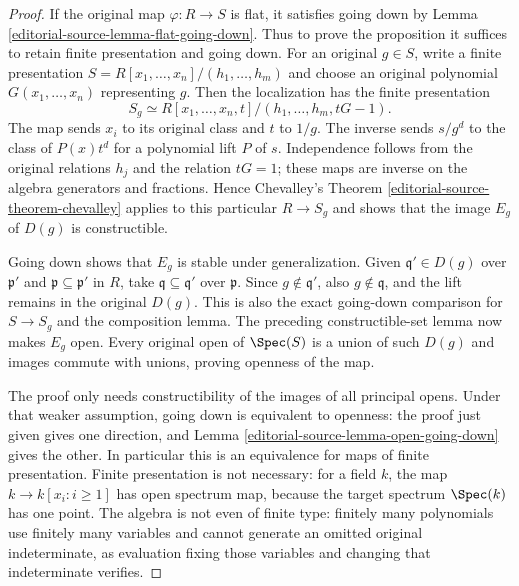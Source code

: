 \begin{proof}
If the original map $\varphi:R\to S$ is flat, it
satisfies going down by Lemma \ref{editorial-source-lemma-flat-going-down}.
Thus to prove the proposition it suffices to retain
finite presentation and going down.
For an original $g\in S$, write a finite presentation
$S=R[x_1,\ldots,x_n]/(h_1,\ldots,h_m)$ and choose
an original polynomial $G(x_1,\ldots,x_n)$ representing
$g$. Then the localization has the finite presentation
$$
S_g\simeq
R[x_1,\ldots,x_n,t]/(h_1,\ldots,h_m,tG-1).
$$
The map sends $x_i$ to its original class and $t$
to $1/g$. The inverse sends $s/g^d$ to the class
of $P(x)t^d$ for a polynomial lift $P$ of $s$.
Independence follows from the original relations
$h_j$ and the relation $tG=1$; these maps are
inverse on the algebra generators and fractions.
Hence Chevalley's Theorem \ref{editorial-source-theorem-chevalley}
applies to this particular $R\to S_g$ and shows
that the image $E_g$ of $D(g)$ is constructible.

Going down shows that $E_g$ is stable under
generalization. Given $\mathfrak q'\in D(g)$ over
$\mathfrak p'$ and $\mathfrak p\subseteq\mathfrak p'$
in $R$, take $\mathfrak q\subseteq\mathfrak q'$
over $\mathfrak p$. Since $g\notin\mathfrak q'$,
also $g\notin\mathfrak q$, and the lift remains
in the original $D(g)$. This is also the exact
going-down comparison for $S\to S_g$ and the
composition lemma. The preceding constructible-set
lemma now makes $E_g$ open. Every original open
of $\Spec(S)$ is a union of such $D(g)$ and images
commute with unions, proving openness of the map.

The proof only needs constructibility of the
images of all principal opens. Under that weaker
assumption, going down is equivalent to openness:
the proof just given gives one direction, and
Lemma \ref{editorial-source-lemma-open-going-down} gives the other.
In particular this is an equivalence for maps of
finite presentation. Finite presentation is not
necessary: for a field $k$, the map
$k\to k[x_i:i\geq1]$ has open spectrum map,
because the target spectrum $\Spec(k)$ has one
point. The algebra is not even of finite type:
finitely many polynomials use finitely many
variables and cannot generate an omitted original
indeterminate, as evaluation fixing those variables
and changing that indeterminate verifies.


\end{proof}
